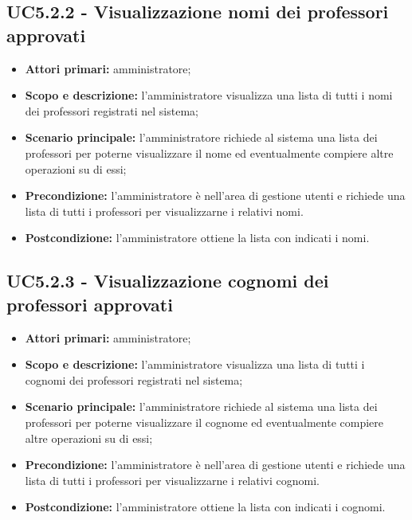 \documentclass[AnalisiDeiRequisiti.tex]{subfiles}
\begin{document}
\subsection{UC5.2.2 - Visualizzazione nomi dei professori approvati}
\begin{itemize}
	\item \textbf{Attori primari:} amministratore;
	\item \textbf{Scopo e descrizione:} l'amministratore visualizza una lista di tutti i nomi dei professori registrati nel sistema;
	\item \textbf{Scenario principale:} l'amministratore richiede al sistema una lista dei professori per poterne visualizzare il nome ed eventualmente compiere altre operazioni su di essi;
	\item \textbf{Precondizione:} l'amministratore è nell'area di gestione utenti e richiede una lista di tutti i professori per visualizzarne i relativi nomi.
	\item \textbf{Postcondizione:} l'amministratore ottiene la lista con indicati i nomi.
\end{itemize}
\subsection{UC5.2.3 - Visualizzazione cognomi dei professori approvati}
\begin{itemize}
	\item \textbf{Attori primari:} amministratore;
	\item \textbf{Scopo e descrizione:} l'amministratore visualizza una lista di tutti i cognomi dei professori registrati nel sistema;
	\item \textbf{Scenario principale:} l'amministratore richiede al sistema una lista dei professori per poterne visualizzare il cognome ed eventualmente compiere altre operazioni su di essi;
	\item \textbf{Precondizione:} l'amministratore è nell'area di gestione utenti e richiede una lista di tutti i professori per visualizzarne i relativi cognomi.
	\item \textbf{Postcondizione:} l'amministratore ottiene la lista con indicati i cognomi.
\end{itemize}
\end{document}
